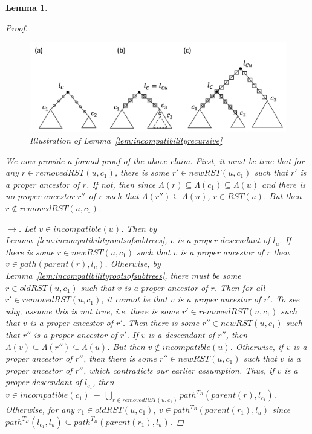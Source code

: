 \documentclass{article}
\newcommand{\leafset}{\Lambda}
\newtheorem{incompatibilityrecursive}[incompatibility]{Lemma}
\begin{document}
\begin{incompatibilityrecursive}
\begin{proof}
            \begin{figure}[h]
                \includegraphics[scale=0.5]{incompatibilityrecursive}
                \centering
                \caption{Illustration of Lemma~\ref{lem:incompatibilityrecursive}}
                \label{fig:incompatibilityrecursive}
            \end{figure}

            We now provide a formal proof of the above claim. First, it must be true that for any $r \in removedRST(u, c_1)$, there is some $r' \in newRST(u, c_1)$ such that $r'$ is a proper ancestor of $r$. If not, then since $\leafset(r) \subseteq \leafset(c_1) \subseteq \leafset(u)$ and there is no proper ancestor $r''$ of $r$ such that $\leafset(r'') \subseteq \leafset(u)$, $r \in RST(u)$. But then $r \not\in removedRST(u, c_1)$.

            $\longrightarrow$. Let $v \in incompatible(u)$. Then by Lemma~\ref{lem:incompatibilityrootsofsubtrees}, $v$ is a proper descendant of $l_u$. If there is some $r \in newRST(u, c_1)$ such that $v$ is a proper ancestor of $r$ then $v \in path(parent(r), l_u)$. Otherwise, by Lemma~\ref{lem:incompatibilityrootsofsubtrees}, there must be some $r \in oldRST(u, c_1)$ such that $v$ is a proper ancestor of $r$. Then for all $r' \in removedRST(u, c_1)$, it cannot be that $v$ is a proper ancestor of $r'$. To see why, assume this is not true, i.e. there is some $r' \in removedRST(u, c_1)$ such that $v$ is a proper ancestor of $r'$. Then there is some $r'' \in newRST(u, c_1)$ such that $r''$ is a proper ancestor of $r'$. If $v$ is a descendant of $r''$, then $\leafset(v) \subseteq \leafset(r'') \subseteq \leafset(u)$. But then $v \not\in incompatible(u)$. Otherwise, if $v$ is a proper ancestor of $r''$, then there is some $r'' \in newRST(u, c_1)$ such that $v$ is a proper ancestor of $r''$, which contradicts our earlier assumption. Thus, if $v$ is a proper descendant of $l_{c_1}$, then $v \in incompatible(c_1)\ -\ \bigcup_{r \in removedRST(u, c_1)} path^{T_B}(parent(r), l_{c_1})$. Otherwise, for any $r_1 \in oldRST(u, c_1)$, $v \in path^{T_B}(parent(r_1), l_u)$ since $path^{T_B}(l_{c_1}, l_u) \subseteq path^{T_B}(parent(r_1), l_u)$.


\end{proof}
\end{incompatibilityrecursive}
\end{document}
